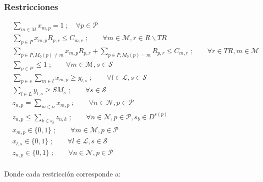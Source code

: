 \documentclass[../informe2.tex]{subfiles}
\begin{document}
\subsubsection{Restricciones}
\begin{align}
	\label{modelo1:r1} &\sum_{m \in M}x_{m,p} = 1\;; \quad \forall p \in \mathcal{P} \\
	\label{modelo1:r2} &\sum_{p \in P}x_{m,p}R_{p,r} \leq C_{m,r}\;; \qquad \forall m \in \mathcal{M}, r \in R\backslash TR \\
	\label{modelo1:r3} &\sum_{p \in P, M_0(p)\neq m}x_{m,p}R_{p,r}+\sum_{p\in P, M_0(p)=m}R_{p,r} \leq C_{m,r}\;; \qquad \forall r \in TR, m \in \mathcal{M} \\
	\label{modelo1:r4} &\sum_{p \in P} \leq 1\;; \qquad \forall m \in \mathcal{M}, s \in \mathcal{S} \\
	\label{modelo1:r5} &\sum_{p \in s}\sum_{m \in l}x_{m,p} \geq y_{l,s}\;; \qquad \forall l \in \mathcal{L}, s \in \mathcal{S} \\
	\label{modelo1:r6} &\sum_{l \in L}y_{l,s} \geq SM_{s}\;; \qquad \forall s \in \mathcal{S} \\
	\label{modelo1:r7} & z_{n,p} = \sum_{m \in n}x_{m,p}\;; \qquad \forall n \in \mathcal{N}, p \in \mathcal{P} \\
	\label{modelo1:r8} & z_{n,p} \leq \sum_{k \in s_b}z_{n,k}\;; \qquad \forall n \in \mathcal{N}, p \in \mathcal{P}, s_b \in D^{s(p)} \\
	\label{modelo1:r9} & x_{m,p} \in \{0,1\}\;; \qquad \forall m \in \mathcal{M}, p \in \mathcal{P} \\
	\label{modelo1:r10} & x_{l,s} \in \{0,1\}\;; \qquad \forall l \in \mathcal{L}, s \in \mathcal{S} \\
	\label{modelo1:r11} & z_{n,p} \in \{0,1\}\;; \qquad \forall n \in \mathcal{N}, p \in \mathcal{P}
\end{align}
\\
Donde cada restricción corresponde a:
\end{document}
